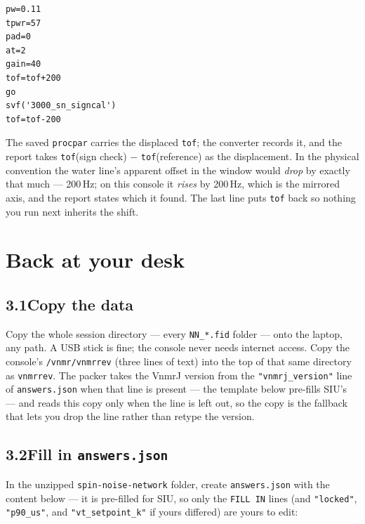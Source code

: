 \documentclass[11pt]{article}
\newcommand{\file}[1]{\texttt{#1}}
\begin{document}
\begin{lstlisting}
pw=0.11
tpwr=57
pad=0
at=2
gain=40
tof=tof+200
go
svf('3000_sn_signcal')
tof=tof-200
\end{lstlisting}

The saved \file{procpar} carries the displaced \texttt{tof}; the
converter records it, and the report takes \texttt{tof}(sign check)
$-$ \texttt{tof}(reference) as the displacement. In the physical
convention the water line's apparent offset in the window would
\emph{drop} by exactly that much --- 200\,Hz; on this console it
\emph{rises} by 200\,Hz, which is the mirrored axis, and the report
states which it found. The last line puts \texttt{tof} back so nothing
you run next inherits the shift.

\section{Back at your desk}

\subsection*{3.1\quad Copy the data}

Copy the whole session directory --- every \file{NN\_*.fid} folder ---
onto the laptop, any path. A USB stick is fine; the console never
needs internet access. Copy the console's \file{/vnmr/vnmrrev} (three
lines of text) into the top of that same directory as \file{vnmrrev}.
The packer takes the VnmrJ version from the \texttt{"vnmrj\_version"}
line of \file{answers.json} when that line is present --- the template
below pre-fills SIU's --- and reads this copy only when the line is
left out, so the copy is the fallback that lets you drop the line
rather than retype the version.

\subsection*{3.2\quad Fill in \file{answers.json}}

In the unzipped \file{spin-noise-network} folder, create
\file{answers.json} with the content below --- it is pre-filled for
SIU, so only the \texttt{FILL IN} lines (and \texttt{"locked"},
\texttt{"p90\_us"}, and \texttt{"vt\_setpoint\_k"} if yours differed)
are yours to edit:
\end{document}
